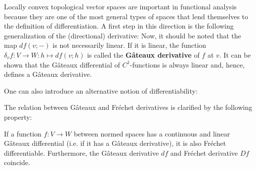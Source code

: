     Locally convex topological vector spaces are important in functional analysis because they are one of the most general types of spaces that lend themselves to the definition of differentiation. A first step in this direction is the following generalization of the (directional) derivative:
    Now, it should be noted that the map $df(v;-)$ is not necessarily linear. If it is linear, the function $\delta_vf:V\rightarrow W:h\mapsto df(v;h)$ is called the \textbf{G\^ateaux derivative} of $f$ at $v$. It can be shown that the G\^ateaux differential of $C^1$-functions is always linear and, hence, defines a G\^ateaux derivative.

    One can also introduce an alternative notion of differentiability:

    The relation between G\^ateaux and Fr\'echet derivatives is clarified by the following property:
    \begin{property}
        If a function $f:V\rightarrow W$ between normed spaces has a continuous and linear G\^ateaux differential (i.e. if it has a G\^ateaux derivative), it is also Fr\'echet differentiable. Furthermore, the G\^ateaux derivative $df$ and Fr\'echet derivative $Df$ coincide.
    \end{property}

